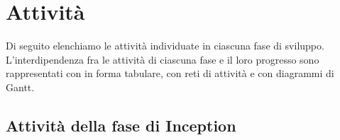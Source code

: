 \section{Attivit\`a}

Di seguito elenchiamo le attivit\`a individuate in ciascuna fase di sviluppo.
L'interdipendenza fra le attivit\`a di ciascuna fase e il loro progresso sono rappresentati con in forma tabulare, con reti di attivit\`a e con diagrammi di Gantt.


\subsection{Attivit\`a della fase di Inception}

